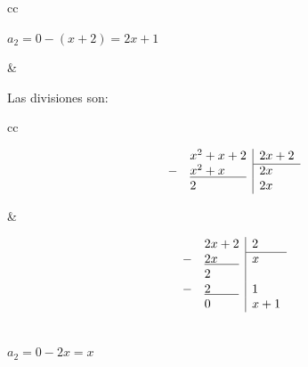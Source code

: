 \begin{Revision}
\begin{ejs}
\begin{center}
\begin{tabular}{cc}
\begin{minipage}[t]{0.4\textwidth}
                    \vspace{1.5em}
                    $ a_2 = 0 - (x+2) = 2x + 1$
                \end{minipage}
                &
                \begin{minipage}[t]{0.4\textwidth}
                    \vspace{0.1em}
                    \centering
                    Las divisiones son:\\
                    \vspace{-0.5em}
                    \hspace{-4.7em}
                    \begin{tabular}{cc}
                        \begin{minipage}[t]{0.52\textwidth}
                            \[
                                \begin{array}{rl|l}
                                    &x^2 +x + 2& 2x +2\\\cline{3-3} 
                                    - & \underline{x^2 + x\phantom{ m...}} & 2x\\
                                    &2& 2x
                                \end{array}
                            \]
                        \end{minipage}
                        &\hspace{1em}
                        \begin{minipage}[t]{0.22\textwidth}
                            \[
                                \begin{array}{rl|l}
                                    &2x +2& 2\\\cline{3-3} 
                                    - & \underline{2x\phantom{ m...}} & x\\
                                    &2& \\
                                    - & \underline{2\phantom{ m.....}} & 1\\
                                    &0& x + 1 
                                \end{array}
                            \]
                        \end{minipage}
                    \end{tabular}\\
                    \vspace{1.5em}
                    $a_2 = 0 - 2x = x $

\end{minipage}
\end{tabular}
\end{center}
\end{ejs}
\end{Revision}
